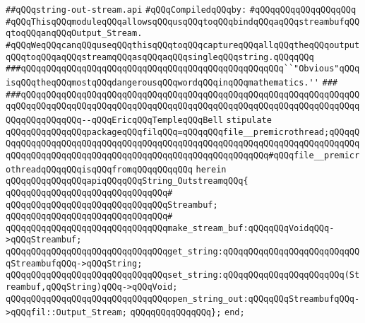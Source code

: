 \label{src/lib/compiler/back/low/library/string-out-stream.api}
\verb|##qQQqstring-out-stream.api|\newline
\newline
\verb|#qQQqCompiledqQQqby:|\newline
\verb|#qQQqqQQqqQQqqQQqqQQq|\newline
\newline
\verb|#qQQqThisqQQqmoduleqQQqallowsqQQqusqQQqtoqQQqbindqQQqaqQQqstreambufqQQqtoqQQqanqQQqOutput_Stream.|\newline
\verb|#qQQqWeqQQqcanqQQquseqQQqthisqQQqtoqQQqcaptureqQQqallqQQqtheqQQqoutputqQQqtoqQQqaqQQqstreamqQQqasqQQqaqQQqsingleqQQqstring.qQQqqQQq|\newline
\newline
\newline
\newline
\verb|###qQQqqQQqqQQqqQQqqQQqqQQqqQQqqQQqqQQqqQQqqQQqqQQqqQQq``"Obvious"qQQqisqQQqtheqQQqmostqQQqdangerousqQQqwordqQQqinqQQqmathematics.''|\newline
\verb|###|\newline
\verb|###qQQqqQQqqQQqqQQqqQQqqQQqqQQqqQQqqQQqqQQqqQQqqQQqqQQqqQQqqQQqqQQqqQQqqQQqqQQqqQQqqQQqqQQqqQQqqQQqqQQqqQQqqQQqqQQqqQQqqQQqqQQqqQQqqQQqqQQqqQQqqQQqqQQqqQQq--qQQqEricqQQqTempleqQQqBell|\newline
\newline
\newline
\verb|stipulate|\newline
\verb|qQQqqQQqqQQqqQQqpackageqQQqfilqQQq=qQQqqQQqfile__premicrothread;qQQqqQQqqQQqqQQqqQQqqQQqqQQqqQQqqQQqqQQqqQQqqQQqqQQqqQQqqQQqqQQqqQQqqQQqqQQqqQQqqQQqqQQqqQQqqQQqqQQqqQQqqQQqqQQqqQQqqQQqqQQqqQQq#qQQqfile__premicrothreadqQQqqQQqisqQQqfromqQQqqQQqqQQq|\newline
\verb|herein|\newline
\newline
\verb|qQQqqQQqqQQqqQQqapiqQQqqQQqString_OutstreamqQQq{|\newline
\verb|qQQqqQQqqQQqqQQqqQQqqQQqqQQqqQQq#|\newline
\verb|qQQqqQQqqQQqqQQqqQQqqQQqqQQqqQQqStreambuf;|\newline
\verb|qQQqqQQqqQQqqQQqqQQqqQQqqQQqqQQq#|\newline
\verb|qQQqqQQqqQQqqQQqqQQqqQQqqQQqqQQqmake_stream_buf:qQQqqQQqVoidqQQq->qQQqStreambuf;|\newline
\verb|qQQqqQQqqQQqqQQqqQQqqQQqqQQqqQQqget_string:qQQqqQQqqQQqqQQqqQQqqQQqqQQqStreambufqQQq->qQQqString;|\newline
\verb|qQQqqQQqqQQqqQQqqQQqqQQqqQQqqQQqset_string:qQQqqQQqqQQqqQQqqQQqqQQq(Streambuf,qQQqString)qQQq->qQQqVoid;|\newline
\verb|qQQqqQQqqQQqqQQqqQQqqQQqqQQqqQQqopen_string_out:qQQqqQQqStreambufqQQq->qQQqfil::Output_Stream;|\newline
\verb|qQQqqQQqqQQqqQQq};|\newline
\verb|end;|\newline

